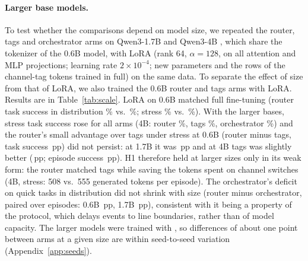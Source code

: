 \documentclass[10pt]{article}
\begin{document}
\paragraph{Larger base models.} To test whether the comparisons depend on model size, we repeated the router, tags and orchestrator arms on Qwen3-1.7B and Qwen3-4B \citep{yang2025qwen3}, which share the tokenizer of the 0.6B model, with LoRA \citep{hu2022lora} (rank 64, $\alpha=128$, on all attention and MLP projections; learning rate $2\times10^{-4}$; new parameters and the rows of the channel-tag tokens trained in full) on the same data. To separate the effect of size from that of LoRA, we also trained the 0.6B router and tags arms with LoRA. Results are in Table~\ref{tab:scale}. LoRA on 0.6B matched full fine-tuning (router task success in distribution \scrouterloraidtask\% vs.\ \scrouterfullidtask\%; stress \scrouterlorasttask\% vs.\ \scrouterfullsttask\%). With the larger bases, stress task success rose for all arms (4B: router \scrouterbigsttask\%, tags \sctagsbigsttask\%, orchestrator \scorchbigsttask\%) and the router's small advantage over tags under stress at 0.6B (router minus tags, task success \scrtfulltask\,pp) did not persist: at 1.7B it was \scrtmidtask\,pp and at 4B tags was slightly better (\scrtbigtask\,pp; episode success \scrtbigepisode\,pp). H1 therefore held at larger sizes only in its weak form: the router matched tags while saving the tokens spent on channel switches (4B, stress: 508 vs.\ 555 generated tokens per episode). The orchestrator's deficit on quick tasks in distribution did not shrink with size (router minus orchestrator, paired over episodes: 0.6B \scquickfull\,pp, 1.7B \scquickmid\,pp\scquickbigclause), consistent with it being a property of the protocol, which delays events to line boundaries, rather than of model capacity. The larger models were trained with \scaleseedsclause, so differences of about one point between arms at a given size are within seed-to-seed variation (Appendix~\ref{app:seeds}).

\begin{table}[t]
\centering\small
\caption{Effect of base-model size. Task, quick-task and episode success in \%, bootstrap 95\% CI over 300 test episodes per split (pooled over seeds where more than one). LoRA: rank 64 on all linear layers of the base model.}
\label{tab:scale}
\resizebox{\linewidth}{!}{}
\end{table}
\end{document}
